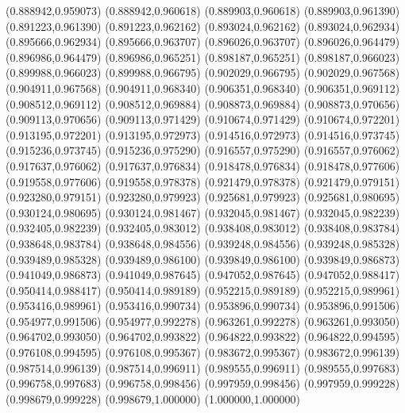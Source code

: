 (0.888942,0.959073)
(0.888942,0.960618)
(0.889903,0.960618)
(0.889903,0.961390)
(0.891223,0.961390)
(0.891223,0.962162)
(0.893024,0.962162)
(0.893024,0.962934)
(0.895666,0.962934)
(0.895666,0.963707)
(0.896026,0.963707)
(0.896026,0.964479)
(0.896986,0.964479)
(0.896986,0.965251)
(0.898187,0.965251)
(0.898187,0.966023)
(0.899988,0.966023)
(0.899988,0.966795)
(0.902029,0.966795)
(0.902029,0.967568)
(0.904911,0.967568)
(0.904911,0.968340)
(0.906351,0.968340)
(0.906351,0.969112)
(0.908512,0.969112)
(0.908512,0.969884)
(0.908873,0.969884)
(0.908873,0.970656)
(0.909113,0.970656)
(0.909113,0.971429)
(0.910674,0.971429)
(0.910674,0.972201)
(0.913195,0.972201)
(0.913195,0.972973)
(0.914516,0.972973)
(0.914516,0.973745)
(0.915236,0.973745)
(0.915236,0.975290)
(0.916557,0.975290)
(0.916557,0.976062)
(0.917637,0.976062)
(0.917637,0.976834)
(0.918478,0.976834)
(0.918478,0.977606)
(0.919558,0.977606)
(0.919558,0.978378)
(0.921479,0.978378)
(0.921479,0.979151)
(0.923280,0.979151)
(0.923280,0.979923)
(0.925681,0.979923)
(0.925681,0.980695)
(0.930124,0.980695)
(0.930124,0.981467)
(0.932045,0.981467)
(0.932045,0.982239)
(0.932405,0.982239)
(0.932405,0.983012)
(0.938408,0.983012)
(0.938408,0.983784)
(0.938648,0.983784)
(0.938648,0.984556)
(0.939248,0.984556)
(0.939248,0.985328)
(0.939489,0.985328)
(0.939489,0.986100)
(0.939849,0.986100)
(0.939849,0.986873)
(0.941049,0.986873)
(0.941049,0.987645)
(0.947052,0.987645)
(0.947052,0.988417)
(0.950414,0.988417)
(0.950414,0.989189)
(0.952215,0.989189)
(0.952215,0.989961)
(0.953416,0.989961)
(0.953416,0.990734)
(0.953896,0.990734)
(0.953896,0.991506)
(0.954977,0.991506)
(0.954977,0.992278)
(0.963261,0.992278)
(0.963261,0.993050)
(0.964702,0.993050)
(0.964702,0.993822)
(0.964822,0.993822)
(0.964822,0.994595)
(0.976108,0.994595)
(0.976108,0.995367)
(0.983672,0.995367)
(0.983672,0.996139)
(0.987514,0.996139)
(0.987514,0.996911)
(0.989555,0.996911)
(0.989555,0.997683)
(0.996758,0.997683)
(0.996758,0.998456)
(0.997959,0.998456)
(0.997959,0.999228)
(0.998679,0.999228)
(0.998679,1.000000)
(1.000000,1.000000)